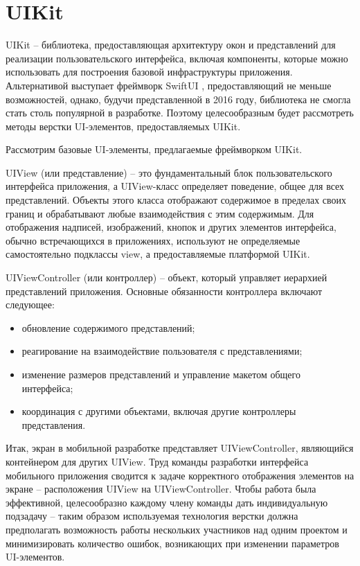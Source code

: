\section{UIKit}

UIKit \cite{uikit} -- библиотека, предоставляющая архитектуру окон и представлений для реализации пользовательского интерфейса, включая компоненты, которые можно использовать для построения базовой инфраструктуры приложения. 
Альтернативой выступает фреймворк SwiftUI \cite{swiftui}, предоставляющий не меньше возможностей, однако, будучи представленной в 2016 году, библиотека не смогла стать столь популярной в разработке. 
Поэтому целесообразным будет рассмотреть методы верстки UI-элементов, предоставляемых UIKit.


Рассмотрим базовые UI-элементы, предлагаемые фреймворком UIKit.

UIView (или представление) \cite{uiview} -- это фундаментальный блок пользовательского интерфейса приложения, а UIView-класс определяет поведение, общее для всех представлений. 
Объекты этого класса отображают содержимое в пределах своих границ и обрабатывают любые взаимодействия с этим содержимым. 
Для отображения надписей, изображений, кнопок и других элементов интерфейса, обычно встречающихся в приложениях, используют не определяемые самостоятельно подклассы view, а предоставляемые платформой UIKit. 

UIViewController (или контроллер) \cite{controller} -- объект, который управляет иерархией представлений приложения. Основные обязанности контроллера включают следующее:

\begin{itemize}[label=---]
	\item обновление содержимого представлений;
	\item реагирование на взаимодействие пользователя с представлениями;
	\item изменение размеров представлений и управление макетом общего интерфейса;
	\item координация с другими объектами, включая другие контроллеры представления.
\end{itemize}

Итак, экран в мобильной разработке представляет UIViewController, являющийся контейнером для других UIView. 
Труд команды разработки интерфейса мобильного приложения сводится к задаче корректного отображения элементов на экране -- расположения UIView на UIViewController. 
Чтобы работа была эффективной, целесообразно каждому члену команды дать индивидуальную подзадачу -- таким образом используемая технология верстки должна предполагать возможность работы нескольких участников над одним проектом и минимизировать количество ошибок, возникающих при изменении параметров UI-элементов. 

